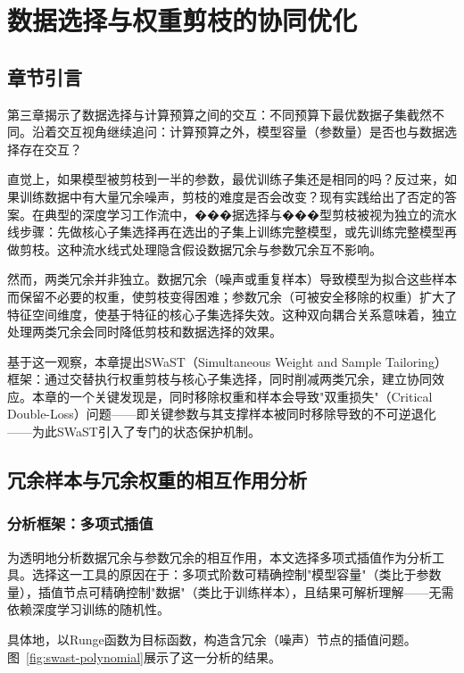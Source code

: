 \chapter{数据选择与权重剪枝的协同优化}

\section{章节引言}

第三章揭示了数据选择与计算预算之间的交互：不同预算下最优数据子集截然不同。沿着交互视角继续追问：计算预算之外，模型容量（参数量）是否也与数据选择存在交互？

直觉上，如果模型被剪枝到一半的参数，最优训练子集还是相同的吗？反过来，如果训练数据中有大量冗余噪声，剪枝的难度是否会改变？现有实践给出了否定的答案。在典型的深度学习工作流中，���据选择与���型剪枝被视为独立的流水线步骤\cite{killamsetty2021grad, evci2020rigging}：先做核心子集选择再在选出的子集上训练完整模型，或先训练完整模型再做剪枝。这种流水线式处理隐含假设数据冗余与参数冗余互不影响。

然而，两类冗余并非独立。数据冗余（噪声或重复样本）导致模型为拟合这些样本而保留不必要的权重，使剪枝变得困难；参数冗余（可被安全移除的权重）扩大了特征空间维度，使基于特征的核心子集选择失效。这种双向耦合关系意味着，独立处理两类冗余会同时降低剪枝和数据选择的效果。

基于这一观察，本章提出SWaST（Simultaneous Weight and Sample Tailoring）框架：通过交替执行权重剪枝与核心子集选择，同时削减两类冗余，建立协同效应。本章的一个关键发现是，同时移除权重和样本会导致"双重损失"（Critical Double-Loss）问题——即关键参数与其支撑样本被同时移除导致的不可逆退化——为此SWaST引入了专门的状态保护机制。


\section{冗余样本与冗余权重的相互作用分析}

\subsection{分析框架：多项式插值}

为透明地分析数据冗余与参数冗余的相互作用，本文选择多项式插值作为分析工具。选择这一工具的原因在于：多项式阶数可精确控制"模型容量"（类比于参数量），插值节点可精确控制"数据"（类比于训练样本），且结果可解析理解——无需依赖深度学习训练的随机性。

具体地，以Runge函数\cite{runge1901empirische}为目标函数，构造含冗余（噪声）节点的插值问题。图~\ref{fig:swast-polynomial}展示了这一分析的结果。

